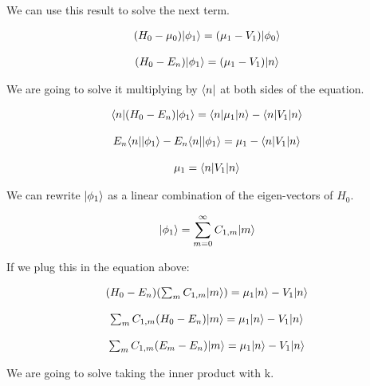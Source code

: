 We can use this result to solve the next term.

\begin{equation}
\begin{array}{c}
  (H_0 - \mu_0)\lvert\phi_1\rangle = (\mu_1 - V_1)\lvert\phi_0\rangle
  \\

  \\
  (H_0 - E_n)\lvert\phi_1\rangle = (\mu_1 - V_1)\lvert n\rangle
\end{array}
\end{equation}

We are going to solve it multiplying by $\langle n\rvert$ at both sides of the equation.

\begin{equation}
  \begin{array}{c}
    \langle n\rvert(H_0 - E_n)\lvert\phi_1\rangle = \langle n\rvert\mu_1\lvert n\rangle - \langle n\rvert V_1\lvert n\rangle
    \\

    \\
    E_n\langle n\rvert\lvert\phi_1\rangle - E_n\langle n\rvert\lvert\phi_1\rangle = \mu_1 - \langle n\rvert V_1\lvert n\rangle
    \\

    \\
    \mu_1 = \langle n\rvert V_1\lvert n\rangle
  \end{array}
\end{equation}

We can rewrite $\lvert\phi_1\rangle$ as a linear combination of the eigen-vectors of $H_0$.

\begin{equation}
  \label{13.16}
  \lvert\phi_1\rangle = \sum_{m=0}^{\infty} C_{1,m} \lvert m\rangle
\end{equation}

If we plug this in the equation above:

\begin{equation}
\begin{array}{c}
  (H_0 - E_n) (\sum_{m} C_{1,m} \lvert m\rangle) = \mu_1 \lvert n\rangle - V_1 \lvert n\rangle
  \\

  \\
  \sum_{m} C_{1,m} (H_0 - E_n) \lvert m\rangle = \mu_1 \lvert n\rangle - V_1 \lvert n\rangle
  \\

  \\
  \sum_{m} C_{1,m} (E_m - E_n) \lvert m\rangle = \mu_1 \lvert n\rangle - V_1 \lvert n\rangle
\end{array}
\end{equation}

We are going to solve taking the inner product with k.

